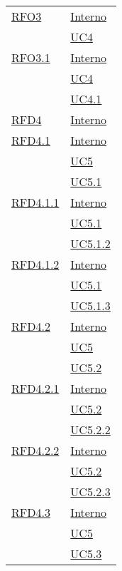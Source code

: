 \begin{longtable}{|>{\centering}m{5cm}|m{5cm}<{\centering}|}
\hyperlink{RFO3}{RFO3} & \hyperlink{Interno}{Interno}\\
& \hyperref[UC4]{UC4}\\ \hline

\hyperlink{RFO3.1}{RFO3.1} & \hyperlink{Interno}{Interno}\\
& \hyperref[UC4]{UC4}\\
& \hyperref[UC4.1]{UC4.1}\\ \hline

\hyperlink{RFD4}{RFD4} & \hyperlink{Interno}{Interno}\\ \hline

\hyperlink{RFD4.1}{RFD4.1} & \hyperlink{Interno}{Interno}\\
& \hyperref[UC5]{UC5}\\
& \hyperref[UC5.1]{UC5.1}\\ \hline

\hyperlink{RFD4.1.1}{RFD4.1.1} & \hyperlink{Interno}{Interno}\\
& \hyperref[UC5.1]{UC5.1}\\
& \hyperref[UC5.1.2]{UC5.1.2}\\ \hline

\hyperlink{RFD4.1.2}{RFD4.1.2} & \hyperlink{Interno}{Interno}\\
& \hyperref[UC5.1]{UC5.1}\\
& \hyperref[UC5.1.3]{UC5.1.3}\\ \hline

\hyperlink{RFD4.2}{RFD4.2} & \hyperlink{Interno}{Interno}\\
& \hyperref[UC5]{UC5}\\
& \hyperref[UC5.2]{UC5.2}\\ \hline

\hyperlink{RFD4.2.1}{RFD4.2.1} & \hyperlink{Interno}{Interno}\\
& \hyperref[UC5.2]{UC5.2}\\
& \hyperref[UC5.2.2]{UC5.2.2}\\ \hline

\hyperlink{RFD4.2.2}{RFD4.2.2} & \hyperlink{Interno}{Interno}\\
& \hyperref[UC5.2]{UC5.2}\\
& \hyperref[UC5.2.3]{UC5.2.3}\\ \hline

\hyperlink{RFD4.3}{RFD4.3} & \hyperlink{Interno}{Interno}\\
& \hyperref[UC5]{UC5}\\
& \hyperref[UC5.3]{UC5.3}\\ \hline


\end{longtable}
